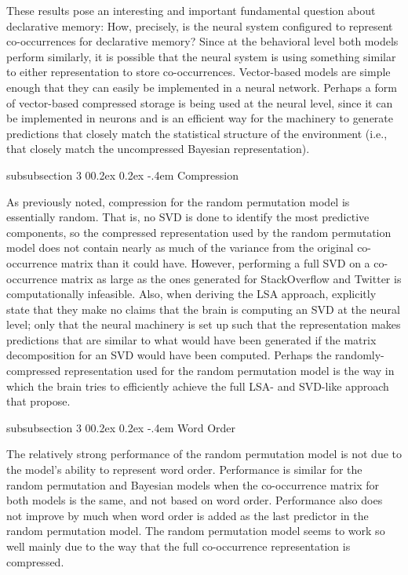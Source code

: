 \documentclass[man,floatsintext,donotrepeattitle]{apa6}
\makeatletter
\renewcommand{\subsubsection}{%
  \@startsection
  {subsubsection}%
  {3}%
  {\parindent}%
  {0\baselineskip \@plus 0.2ex \@minus 0.2ex}%
  {-.4em}%
  {\normalfont\normalsize\bfseries\addperi}}
\makeatother
\begin{document}
These results pose an interesting and important fundamental question about declarative memory:
How, precisely, is the neural system configured to represent co-occurrences for declarative memory?
Since at the behavioral level both models perform similarly, it is possible that the neural system is using something similar to either representation to store co-occurrences.
Vector-based models are simple enough that they can easily be implemented in a neural network.
Perhaps a form of vector-based compressed storage is being used at the neural level,
since it can be implemented in neurons and is an efficient way for the machinery to generate predictions that closely match the statistical structure of the environment
(i.e., that closely match the uncompressed Bayesian representation).

\subsubsection{Compression}

As previously noted, compression for the random permutation model is essentially random.
That is, no SVD is done to identify the most predictive components,
so the compressed representation used by the random permutation model does not contain nearly as much of the variance from the original co-occurrence matrix than it could have.
However, performing a full SVD on a co-occurrence matrix as large as the ones generated for StackOverflow and Twitter is computationally infeasible.
Also, when deriving the LSA approach, \textcite{Landauer1997} explicitly state that they make no claims that the brain is computing an SVD at the neural level;
only that the neural machinery is set up such that the representation makes predictions that are similar to what would have been generated if the matrix decomposition for an SVD would have been computed.
Perhaps the randomly-compressed representation used for the random permutation model is the way in which the brain tries to efficiently achieve the full LSA- and SVD-like approach that \citeauthor{Landauer1997} propose.

\subsubsection{Word Order}

The relatively strong performance of the random permutation model is not due to the model's ability to represent word order.
Performance is similar for the random permutation and Bayesian models when the co-occurrence matrix for both models is the same, and not based on word order.
Performance also does not improve by much when word order is added as the last predictor in the random permutation model.
The random permutation model seems to work so well mainly due to the way that the full co-occurrence representation is compressed.
\end{document}

